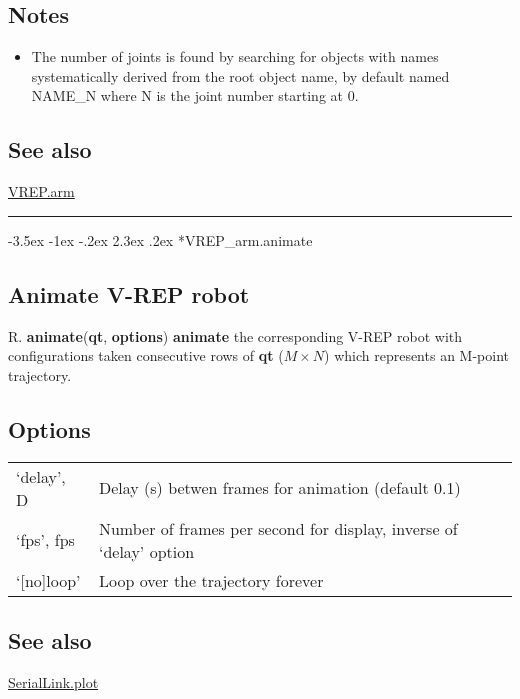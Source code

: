 \documentclass[a4paper]{article}
\makeatletter
\renewcommand\section{%
\@startsection{section}{1}{\z@}%
  {-3.5ex \@plus -1ex \@minus -.2ex}%
  {2.3ex \@plus.2ex}%
  {\color{red}\sffamily\huge\bfseries}}
\makeatother
\begin{document}
\subsection*{Notes}
\begin{itemize}
  \item The number of joints is found by searching for objects
with names systematically derived from the root object name, by
default named NAME\_N where N is the joint number starting at 0.
\end{itemize}
\subsection*{See also}


\hyperlink{VREP.arm}{\color{blue} VREP.arm}

\vspace{1.5ex}\hrule

\hypertarget{VREP\_arm.animate}{\section*{VREP\_arm.animate}}
\subsection*{Animate V-REP robot}
R.\textbf{\color{red} animate}(\textbf{qt}, \textbf{options}) \textbf{\color{red} animate} the corresponding V-REP robot with
configurations taken consecutive rows of \textbf{qt} ($M \times N$) which represents
an M-point trajectory.

\subsection*{Options}
\begin{tabular}{lp{120mm}}
`delay', D & Delay (s) betwen frames for animation (default 0.1)\\ 
`fps', fps & Number of frames per second for display, inverse of `delay' option\\ 
 `[no]loop' & Loop over the trajectory forever\\ 
\end{tabular}\vspace{1ex}
\subsection*{See also}


\hyperlink{SerialLink.plot}{\color{blue} SerialLink.plot}
\end{document}
